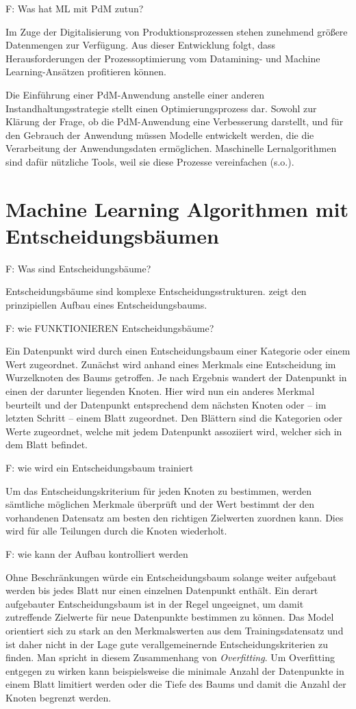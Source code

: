 F: Was hat ML mit PdM zutun?

Im Zuge der Digitalisierung von Produktionsprozessen stehen zunehmend größere Datenmengen zur Verfügung. Aus dieser Entwicklung folgt, dass Herausforderungen der Prozessoptimierung vom Datamining- und Machine Learning-Ansätzen profitieren können.~\cite[S.~35]{Schafer.25.09.201927.09.2019}

Die Einführung einer PdM-Anwendung anstelle einer anderen Instandhaltungsstrategie stellt einen Optimierungsprozess dar. Sowohl zur Klärung der Frage, ob die PdM-Anwendung eine Verbesserung darstellt, und für den Gebrauch der Anwendung müssen Modelle entwickelt werden, die die Verarbeitung der Anwendungsdaten ermöglichen. Maschinelle Lernalgorithmen sind dafür nützliche Tools, weil sie diese Prozesse vereinfachen (s.o.).

\section{Machine Learning Algorithmen mit Entscheidungsbäumen}
\label{sec:algorithmen_mit_entscheidungsbaum}
F: Was sind Entscheidungsbäume?

Entscheidungsbäume sind komplexe Entscheidungsstrukturen.  zeigt den prinzipiellen Aufbau eines Entscheidungsbaums.

F: wie FUNKTIONIEREN Entscheidungsbäume?

Ein Datenpunkt wird durch einen Entscheidungsbaum einer Kategorie oder einem Wert zugeordnet. Zunächst wird anhand eines Merkmals eine Entscheidung im Wurzelknoten des Baums getroffen. Je nach Ergebnis wandert der Datenpunkt in einen der darunter liegenden Knoten. Hier wird nun ein anderes Merkmal beurteilt und der Datenpunkt entsprechend dem nächsten Knoten oder -- im letzten Schritt -- einem Blatt zugeordnet. Den Blättern sind die Kategorien oder Werte zugeordnet, welche mit jedem Datenpunkt assoziiert wird, welcher sich in dem Blatt befindet. 

F: wie wird ein Entscheidungsbaum trainiert

Um das Entscheidungskriterium für jeden Knoten zu bestimmen, werden sämtliche möglichen Merkmale überprüft und der Wert bestimmt der den vorhandenen Datensatz am besten den richtigen Zielwerten zuordnen kann. Dies wird für alle Teilungen durch die Knoten wiederholt.~\cite{Muller.2017}

F: wie kann der Aufbau kontrolliert werden

Ohne Beschränkungen würde ein Entscheidungsbaum solange weiter aufgebaut werden bis jedes Blatt nur einen einzelnen Datenpunkt enthält. Ein derart aufgebauter Entscheidungsbaum ist in der Regel ungeeignet, um damit zutreffende Zielwerte für neue Datenpunkte bestimmen zu können. Das Model orientiert sich zu stark an den Merkmalswerten aus dem Trainingsdatensatz und ist daher nicht in der Lage gute verallgemeinernde Entscheidungskriterien zu finden. Man spricht in diesem Zusammenhang von \textit{Overfitting}. Um Overfitting entgegen zu wirken kann beispielsweise die minimale Anzahl der Datenpunkte in einem Blatt limitiert werden oder die Tiefe des Baums und damit die Anzahl der Knoten begrenzt werden.

